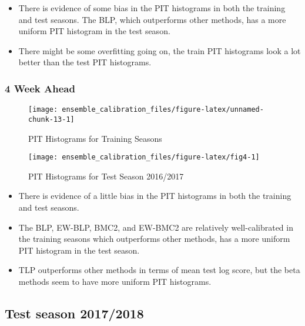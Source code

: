 \documentclass[
]{article}
\begin{document}
\begin{itemize}
\item There is evidence of some bias in the PIT histograms in both the training and test seasons. The BLP, which outperforms other methods, has a more uniform PIT histogram in the test season.
\item There might be some overfitting going on, the train PIT histograms look a lot better than the test PIT histograms.
\end{itemize}

\newpage

\hypertarget{week-ahead-3}{%
\subsubsection{4 Week Ahead}\label{week-ahead-3}}

\begin{figure}[H]

{\centering \texttt{[image: ensemble\_calibration\_files/figure-latex/unnamed-chunk-13-1]} 

}

\caption{PIT Histograms for Training Seasons}\label{fig:unnamed-chunk-13}
\end{figure}

\newpage

\begin{figure}[H]

{\centering \texttt{[image: ensemble\_calibration\_files/figure-latex/fig4-1]} 

}

\caption{PIT Histograms for Test Season 2016/2017}\label{fig:fig4}
\end{figure}

\begin{itemize}
\item There is evidence of a little bias in the PIT histograms in both the training and test seasons. 
\item The BLP, EW-BLP, BMC2, and EW-BMC2 are relatively well-calibrated in the training seasons which outperforms other methods, has a more uniform PIT histogram in the test season.
\item TLP outperforms other methods in terms of mean test log score, but the beta methods seem to have more uniform PIT histograms.
\end{itemize}

\newpage

\hypertarget{test-season-20172018}{%
\subsection{Test season 2017/2018}\label{test-season-20172018}}
\end{document}
